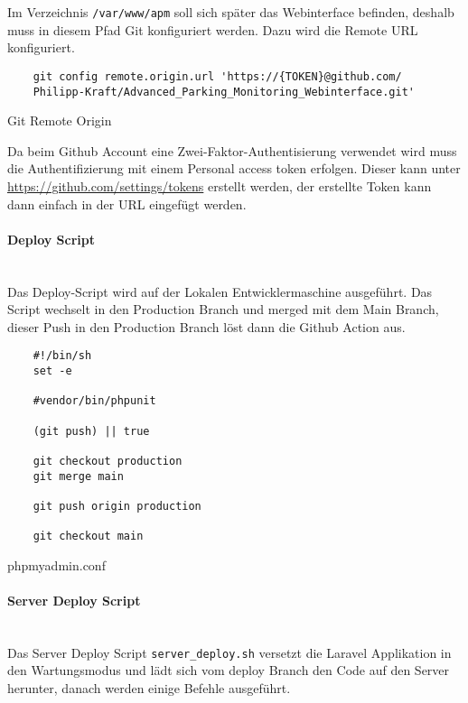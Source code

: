 Im Verzeichnis \verb|/var/www/apm| soll sich später das Webinterface befinden,
deshalb muss in diesem Pfad Git konfiguriert werden. Dazu wird die Remote URL
konfiguriert.

\begin{listing}[H]
  \begin{verbatim}
    git config remote.origin.url 'https://{TOKEN}@github.com/
    Philipp-Kraft/Advanced_Parking_Monitoring_Webinterface.git'
  \end{verbatim}
  \caption{Git Remote Origin}
\end{listing}

Da beim Github Account eine Zwei-Faktor-Authentisierung verwendet wird muss die
Authentifizierung mit einem Personal access token erfolgen. Dieser kann unter
\url{https://github.com/settings/tokens} erstellt werden, der erstellte Token
kann dann einfach in der URL eingefügt werden.

\paragraph{Deploy Script}\mbox{}\\

Das Deploy-Script wird auf der Lokalen Entwicklermaschine ausgeführt. Das Script wechselt in den Production Branch und merged mit dem Main Branch, dieser Push in den Production Branch löst dann die Github Action aus.

\begin{listing}[H]
  \begin{verbatim}
    #!/bin/sh
    set -e
    
    #vendor/bin/phpunit
    
    (git push) || true
    
    git checkout production
    git merge main
    
    git push origin production
    
    git checkout main
  \end{verbatim}
  \caption{phpmyadmin.conf}
\end{listing}

\paragraph{Server Deploy Script}\mbox{}\\

Das Server Deploy Script \verb|server_deploy.sh| versetzt die Laravel Applikation in den Wartungsmodus und lädt sich vom deploy Branch den Code auf den Server herunter, danach werden einige Befehle ausgeführt.

